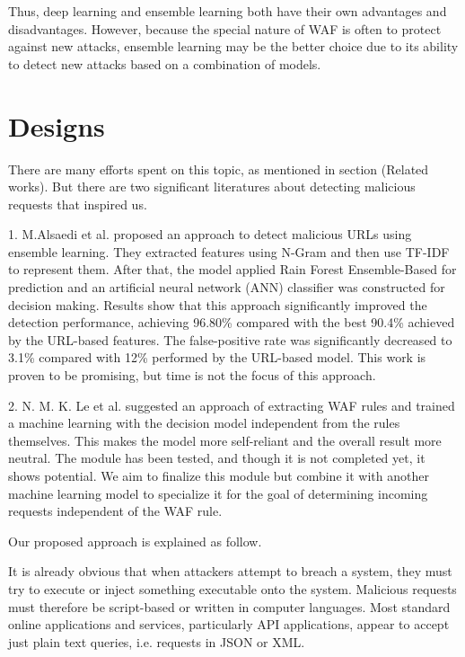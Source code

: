 Thus, deep learning and ensemble learning both have their own advantages and disadvantages. However, because the special nature of WAF is often to protect against new attacks, ensemble learning may be the better choice due to its ability to detect new attacks based on a combination of models.

\section{Designs}
\label{design}
\hspace{0.5cm}There are many efforts spent on this topic, as mentioned in section (Related works). But there are two significant literatures about detecting malicious requests that inspired us. 

1. M.Alsaedi et al.\cite{s22093373} proposed an approach to detect malicious URLs using ensemble learning. They extracted features using N-Gram and then use TF-IDF to represent them. After that, the model applied Rain Forest Ensemble-Based for prediction and an artificial neural network (ANN) classifier was constructed for decision making. Results show that this approach significantly improved the detection performance, achieving 96.80\% compared with the best 90.4\% achieved by the URL-based features. The false-positive rate was significantly decreased to 3.1\% compared with 12\% performed by the URL-based model. This work is proven to be promising, but time is not the focus of this approach. 

2. N. M. K. Le et al.\cite{Khoi} suggested an approach of extracting WAF rules and trained a machine learning with the decision model independent from the rules themselves. This makes the model more self-reliant and the overall result more neutral. The module has been tested, and though it is not completed yet, it shows potential. We aim to finalize this module but combine it with another machine learning model to specialize it for the goal of determining incoming requests independent of the WAF rule.

\newpage
Our proposed approach is explained as follow.

It is already obvious that when attackers attempt to breach a system, they must try to execute or inject something executable onto the system. Malicious requests must therefore be script-based or written in computer languages. Most standard online applications and services, particularly API applications, appear to accept just plain text queries, i.e. requests in JSON or XML. 

